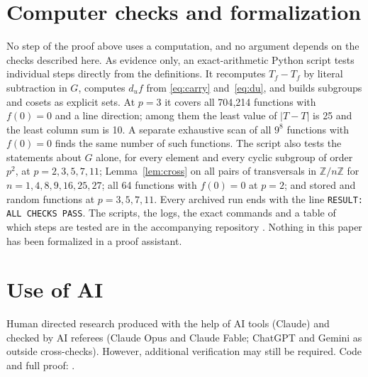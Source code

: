 \documentclass[11pt]{amsart}
\theoremstyle{definition}\newtheorem{definition}[theorem]{Definition}
\theoremstyle{remark}\newtheorem{remark}[theorem]{Remark}
\newcommand{\Z}{\mathbb{Z}}
\newcommand{\abs}[1]{\lvert #1\rvert}
\begin{document}
\section{Computer checks and formalization}\label{sec:computer}

No step of the proof above uses a computation, and no argument depends on the checks described here.
As evidence only, an exact-arithmetic Python script tests individual steps directly from the definitions.
It recomputes \(T_f-T_f\) by literal subtraction in \(G\), computes \(d_uf\) from \eqref{eq:carry} and~\eqref{eq:du}, and builds subgroups and cosets as explicit sets.
At \(p=3\) it covers all 704{,}214 functions with \(f(0)=0\) and a line direction; among them the least value of \(\abs{T-T}\) is 25 and the least column sum is 10.
A separate exhaustive scan of all \(9^8\) functions with \(f(0)=0\) finds the same number of such functions.
The script also tests the statements about \(G\) alone, for every element and every cyclic subgroup of order \(p^2\), at \(p=2,3,5,7,11\); Lemma~\ref{lem:cross} on all pairs of transversals in \(\Z/n\Z\) for \(n=1,4,8,9,16,25,27\); all 64 functions with \(f(0)=0\) at \(p=2\); and stored and random functions at \(p=3,5,7,11\).
Every archived run ends with the line \texttt{RESULT: ALL CHECKS PASS}.
The scripts, the logs, the exact commands and a table of which steps are tested are in the accompanying repository \cite{repo}.
Nothing in this paper has been formalized in a proof assistant.

\section*{Use of AI}

Human directed research produced with the help of AI tools (Claude) and checked by AI referees (Claude Opus and Claude Fable; ChatGPT and Gemini as outside cross-checks).
However, additional verification may still be required.
Code and full proof: \cite{repo}.
\end{document}
